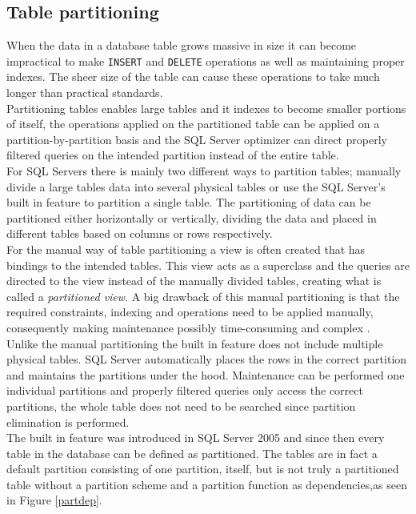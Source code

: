 \documentclass{cslthse-msc}
\begin{document}
\subsection{Table partitioning}
When the data in a database table grows massive in size it can become impractical to make \texttt{INSERT} and \texttt{DELETE} operations as well as maintaining proper indexes. The sheer size of the table can cause these operations to take much longer than practical standards.\\
Partitioning tables enables large tables and it indexes to become smaller portions of itself, the operations applied on the partitioned table can be applied on a partition-by-partition basis and the SQL Server optimizer can direct properly filtered queries on the intended partition instead of the entire table.\\
For SQL Servers there is mainly two different ways to partition tables; manually divide a large tables data into several physical tables or use the SQL Server's built in feature to partition a single table. The partitioning of data can be partitioned either horizontally or vertically, dividing the data and placed in different tables based on columns or rows respectively.\\For the manual way of table partitioning a view is often created that has bindings to the intended tables. This view acts as a superclass and the queries are directed to the view instead of the manually divided tables, creating what is called a \textit{partitioned view}. A big drawback of this manual partitioning is that the required constraints, indexing and operations need to be applied manually, consequently making maintenance possibly time-consuming and complex \cite{tablepartitioning}. \\
Unlike the manual partitioning the built in feature does not include multiple physical tables. SQL Server automatically places the rows in the correct partition and maintains the partitions under the hood. Maintenance          can be performed one individual partitions and properly filtered queries only access the correct partitions, the whole table does not need to be searched since partition elimination is performed.\\
The built in feature was introduced in SQL Server 2005 and since then every table in the database can be defined as partitioned. The tables are in fact a default partition consisting of one partition, itself, but is not truly a partitioned table without a partition scheme and a partition function as dependencies,as seen in Figure \ref{partdep}.
 
\end{document}
